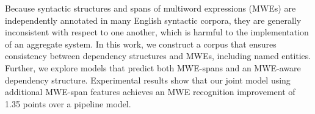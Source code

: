 Because syntactic structures and spans of multiword expressions (MWEs) are independently annotated in many English syntactic corpora, they are generally inconsistent with respect to one another, which is harmful to the implementation of an aggregate system. In this work, we construct a corpus that ensures consistency between dependency structures and MWEs, including named entities. Further, we explore models that predict both MWE-spans and an MWE-aware dependency structure. Experimental results show that our joint model using additional MWE-span features achieves an MWE recognition improvement of 1.35 points over a pipeline model.

